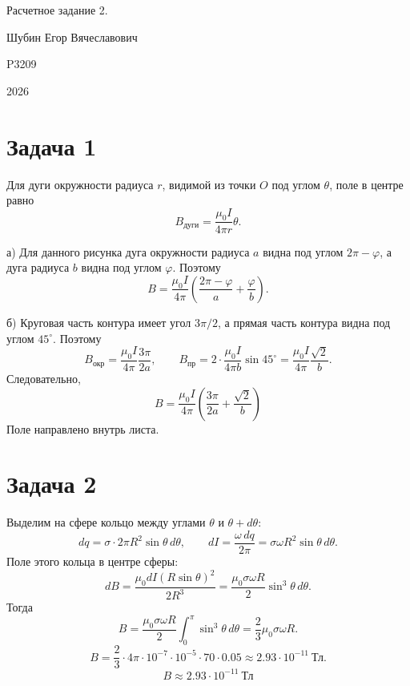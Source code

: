 \documentclass[a4paper,12pt]{article}
\begin{document}
\begin{titlepage}
    \centering
    \vspace*{0.25\textheight}
    {\LARGE Расчетное задание 2.\par}
    \vspace{1.5cm}
    {\Large Шубин Егор Вячеславович\par}
    {\Large P3209\par}
    \vfill
    {\large 2026\par}
\end{titlepage}

\section*{Задача 1}

Для дуги окружности радиуса \(r\), видимой из точки \(O\) под углом
\(\theta\), поле в центре равно
\[
    B_{\text{дуги}}=\frac{\mu_0 I}{4\pi r}\theta .
\]

а) Для данного рисунка дуга окружности радиуса \(a\) видна под углом \(2\pi-\varphi\), а дуга радиуса \(b\) видна под углом \(\varphi\). Поэтому
\[
    B=\frac{\mu_0 I}{4\pi}
    \left(\frac{2\pi-\varphi}{a}+\frac{\varphi}{b}\right).
\]

б) Круговая часть контура имеет угол \(3\pi/2\), а прямая часть контура видна под углом \(45^\circ\). Поэтому
\[
    B_{\text{окр}}=\frac{\mu_0 I}{4\pi}\frac{3\pi}{2a},
    \qquad
    B_{\text{пр}}=
    2\cdot\frac{\mu_0 I}{4\pi b}\sin45^\circ
    =\frac{\mu_0 I}{4\pi}\frac{\sqrt2}{b}.
\]
Следовательно,
\[
    B=\frac{\mu_0 I}{4\pi}
    \left(\frac{3\pi}{2a}+\frac{\sqrt2}{b}\right)
\]
Поле направлено внутрь листа.

\section*{Задача 2}

Выделим на сфере кольцо между углами \(\theta\) и \(\theta+d\theta\):
\[
    dq=\sigma\cdot 2\pi R^2\sin\theta\,d\theta,
    \qquad
    dI=\frac{\omega\,dq}{2\pi}
    =\sigma\omega R^2\sin\theta\,d\theta .
\]
Поле этого кольца в центре сферы:
\[
    dB=\frac{\mu_0 dI(R\sin\theta)^2}{2R^3}
    =\frac{\mu_0\sigma\omega R}{2}\sin^3\theta\,d\theta .
\]
Тогда
\[
    B=\frac{\mu_0\sigma\omega R}{2}\int_0^\pi\sin^3\theta\,d\theta
    =\frac{2}{3}\mu_0\sigma\omega R.
\]
\[
    B=\frac{2}{3}\cdot 4\pi\cdot10^{-7}\cdot10^{-5}\cdot70\cdot0.05
    \approx 2.93\cdot10^{-11}\ \text{Тл}.
\]
\[
  B\approx 2.93\cdot10^{-11}\ \text{Тл}
\]
\end{document}
